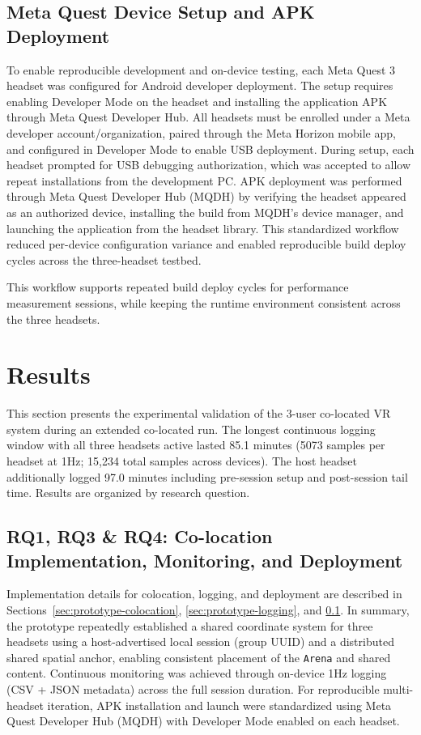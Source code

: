 \documentclass[conference]{IEEEtran}
\begin{document}
\subsection{Meta Quest Device Setup and APK Deployment}
\label{sec:prototype-deployment}
To enable reproducible development and on-device testing, each Meta Quest 3 headset was configured for Android developer deployment. The setup requires enabling Developer Mode on the headset and installing the application APK through Meta Quest Developer Hub\cite{MetaMQDHGettingStarted2025}.
All headsets must be enrolled under a Meta developer account/organization, paired through the Meta Horizon mobile app, and configured in Developer Mode to enable USB deployment. During setup, each headset prompted for USB debugging authorization, which was accepted to allow repeat installations from the development PC. APK deployment was performed through Meta Quest Developer Hub (MQDH) by verifying the headset appeared as an authorized device, installing the build from MQDH's device manager, and launching the application from the headset library. This standardized workflow reduced per-device configuration variance and enabled reproducible build deploy cycles across the three-headset testbed.

This workflow supports repeated build deploy cycles for performance measurement sessions, while keeping the runtime environment consistent across the three headsets.

\section{Results}

This section presents the experimental validation of the 3-user co-located VR system during an extended co-located run. The longest continuous logging window with all three headsets active lasted 85.1 minutes (5073 samples per headset at 1Hz; 15,234 total samples across devices). The host headset additionally logged 97.0 minutes including pre-session setup and post-session tail time. Results are organized by research question.

\subsection{RQ1, RQ3 \& RQ4: Co-location Implementation, Monitoring, and Deployment}

Implementation details for colocation, logging, and deployment are described in Sections~\ref{sec:prototype-colocation}, \ref{sec:prototype-logging}, and \ref{sec:prototype-deployment}. In summary, the prototype repeatedly established a shared coordinate system for three headsets using a host-advertised local session (group UUID) and a distributed shared spatial anchor, enabling consistent placement of the \texttt{Arena} and shared content. Continuous monitoring was achieved through on-device 1Hz logging (CSV + JSON metadata) across the full session duration. For reproducible multi-headset iteration, APK installation and launch were standardized using Meta Quest Developer Hub (MQDH) with Developer Mode enabled on each headset.
\end{document}
